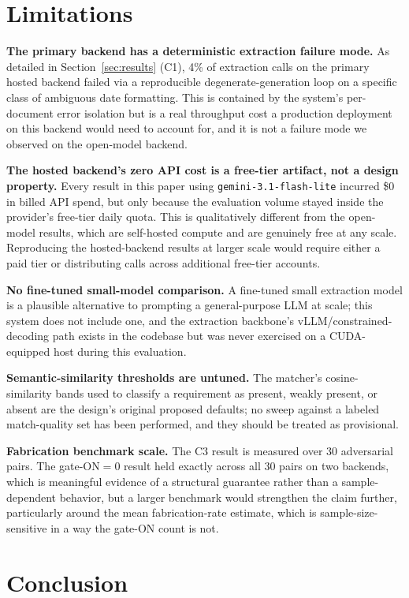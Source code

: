 \documentclass{article}
\begin{document}
\section{Limitations}

\textbf{The primary backend has a deterministic extraction failure mode.} As detailed in
Section~\ref{sec:results} (C1), 4\% of extraction calls on the primary hosted backend
failed via a reproducible degenerate-generation loop on a specific class of ambiguous date
formatting. This is contained by the system's per-document error isolation but is a real
throughput cost a production deployment on this backend would need to account for, and it is not
a failure mode we observed on the open-model backend.

\textbf{The hosted backend's zero API cost is a free-tier artifact, not a design property.} Every
result in this paper using \texttt{gemini-3.1-flash-lite} incurred \$0 in billed API spend, but
only because the evaluation volume stayed inside the provider's free-tier daily quota. This is
qualitatively different from the open-model results, which are self-hosted compute and are
genuinely free at any scale. Reproducing the hosted-backend results at larger scale would require
either a paid tier or distributing calls across additional free-tier accounts.

\textbf{No fine-tuned small-model comparison.} A fine-tuned small extraction model is a
plausible alternative to prompting a general-purpose LLM at scale; this system does not include
one, and the extraction backbone's vLLM/constrained-decoding path exists in the codebase but was
never exercised on a CUDA-equipped host during this evaluation.

\textbf{Semantic-similarity thresholds are untuned.} The matcher's cosine-similarity bands used to
classify a requirement as present, weakly present, or absent are the design's original proposed
defaults; no sweep against a labeled match-quality set has been performed, and they should be
treated as provisional.

\textbf{Fabrication benchmark scale.} The C3 result is measured over 30 adversarial pairs. The
gate-ON$=0$ result held exactly across all 30 pairs on two backends, which is meaningful evidence
of a structural guarantee rather than a sample-dependent behavior, but a larger benchmark would
strengthen the claim further, particularly around the mean fabrication-rate estimate, which is
sample-size-sensitive in a way the gate-ON count is not.

\section{Conclusion}
\end{document}
